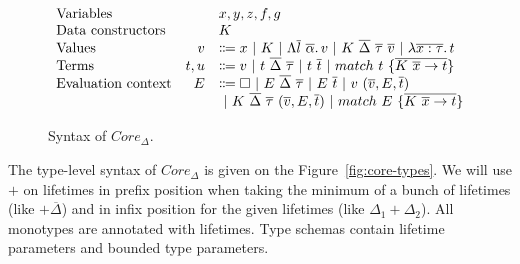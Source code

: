 \documentclass[11pt]{article}
\newcommand{\vor}{~|~}
\newcommand{\ap}{~}
\begin{document}
    \begin{figure}
        \centering
        \[
            \begin{array}{lrl}
                \text{Variables}          &   & x, y, z, f, g                                                                                                                          \\
                \text{Data constructors}  &   & K                                                                                                                                      \\
                \text{Values} & v & \Coloneqq x \vor K \vor \Lambda \overline{l}~\overline{\alpha} \ldotp v \vor K\ap\overline{\Delta}\ap \overline{\tau} \ap \overline{v} \vor \lambda \overline{x : \tau}\ldotp t
                \\
                \text{Terms} & t, u & \Coloneqq v \vor t\ap\overline{\Delta}\ap\overline{\tau} \vor t\ap \overline{t} \vor match ~ t ~\{\overline{K \ap \overline{x} \to t}\}
                \\
                \text{Evaluation context} & E & \Coloneqq \square \vor E \ap\overline{\Delta}\ap \overline{\tau} \vor E \ap \overline{t} \vor v \ap (\overline{v}, E, \overline{t})    \\
                &   & \vor K\ap\overline{\Delta}\ap\overline{\tau}\ap(\overline{v}, E, \overline{t}) \vor match\ap E\ap \{\overline{K\ap\overline{x}\to t}\}
            \end{array}
        \]
        \caption{Syntax of $Core_\Delta$.}
        \label{fig:core-syntax}
    \end{figure}

    The type-level syntax of $Core_\Delta$ is given on the Figure\ \ref{fig:core-types}.
    We will use $+$ on lifetimes in prefix position when taking the minimum of a bunch of lifetimes (like $+\overline{\Delta}$) and in infix position for the given lifetimes (like $\Delta_1 + \Delta_2$).
    All monotypes are annotated with lifetimes.
    Type schemas contain lifetime parameters and bounded type parameters.
\end{document}
